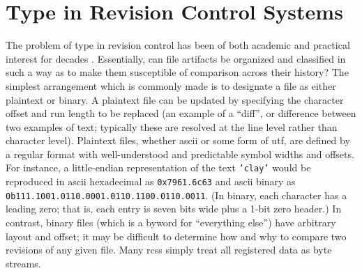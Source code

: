 \documentclass[twoside]{article}
\begin{document}
\section{Type in Revision Control Systems}

The problem of type in revision control has been of both academic and practical interest for decades \citep{Perry1987}.  Essentially, can file artifacts be organized and classified in such a way as to make them susceptible of comparison across their history?  The simplest arrangement which is commonly made is to designate a file as either plaintext or binary.  A plaintext file can be updated by specifying the character offset and run length to be replaced (an example of a “diff”, or difference between two examples of text; typically these are resolved at the line level rather than character level).  Plaintext files, whether {\sc ascii} or some form of {\sc utf}, are defined by a regular format with well-understood and predictable symbol widths and offsets.  For instance, a little-endian representation of the text \texttt{'clay'} would be reproduced in {\sc ascii} hexadecimal as \texttt{0x7961.6c63} and {\sc ascii} binary as \texttt{0b111.1001.0110.0001.0110.1100.0110.0011}.  (In binary, each character has a leading zero; that is, each entry is seven bits wide plus a 1-bit zero header.)  In contrast, binary files (which is a byword for “everything else”) have arbitrary layout and offset; it may be difficult to determine how and why to compare two revisions of any given file.  Many {\sc rcs}s simply treat all registered data as byte streams.
\end{document}
